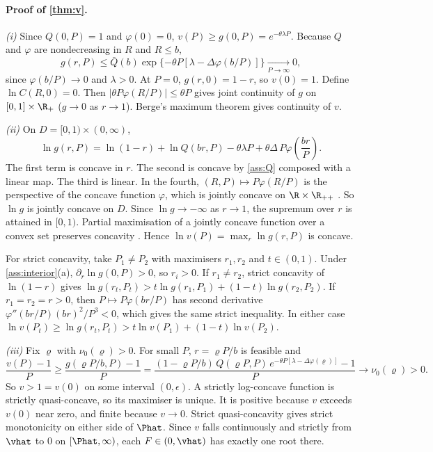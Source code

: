 \paragraph{Proof of \cref{thm:v}.}
\emph{(i)} Since $Q(0,P)=1$ and $\varphi(0)=0$, $v(P)\ge g(0,P)=e^{-\theta\lambda P}$. Because $Q$ and $\varphi$ are nondecreasing in $R$ and $R\le b$,
\[
g(r,P)\le \bar Q(b)\exp\{-\theta P[\lambda-\Delta\varphi(b/P)]\}\xrightarrow[P\to\infty]{}0,
\]
since $\varphi(b/P)\to0$ and $\lambda>0$. At $P=0$, $g(r,0)=1-r$, so $v(0)=1$. Define $\ln C(R,0)=0$. Then $|\theta P\varphi(R/P)|\le\theta P$ gives joint continuity of $g$ on $[0,1]\times\R_+$ ($g\to0$ as $r\to1$). Berge's maximum theorem gives continuity of $v$.

\emph{(ii)} On $D=[0,1)\times(0,\infty)$,
\[
\ln g(r,P)=\ln(1-r)+\ln Q(br,P)-\theta\lambda P+\theta\Delta\,P\varphi\!\left(\frac{br}{P}\right).
\]
The first term is concave in $r$. The second is concave by \cref{ass:Q}
composed with a linear map. The third is linear. In the fourth, $(R,P)\mapsto
P\varphi(R/P)$ is the perspective of the concave function $\varphi$, which is
jointly concave on $\R\times\R_{++}$ \citep[\S3.2.6]{boydvandenberghe2004}. So
$\ln g$ is jointly concave on $D$. Since $\ln g\to-\infty$ as $r\to1$, the
supremum over $r$ is attained in $[0,1)$. Partial maximisation of a jointly
concave function over a convex set preserves concavity
\citep[\S3.2.5]{boydvandenberghe2004}. Hence $\ln v(P)=\max_r\ln g(r,P)$ is concave.

For strict concavity, take $P_1\neq P_2$ with maximisers $r_1,r_2$ and $t\in(0,1)$. Under \cref{ass:interior}(a), $\partial_r\ln g(0,P)>0$, so $r_i>0$. If $r_1\neq r_2$, strict concavity of $\ln(1-r)$ gives
$\ln g(r_t,P_t)>t\ln g(r_1,P_1)+(1-t)\ln g(r_2,P_2)$. If $r_1=r_2=r>0$, then $P\mapsto P\varphi(br/P)$ has second derivative $\varphi''(br/P)(br)^2/P^3<0$, which gives the same strict inequality. In either case $\ln v(P_t)\ge\ln g(r_t,P_t)>t\ln v(P_1)+(1-t)\ln v(P_2)$.

\emph{(iii)} Fix $\varrho$ with $\nu_0(\varrho)>0$. For small $P$, $r=\varrho P/b$ is feasible and
\[
\frac{v(P)-1}{P}\ge\frac{g(\varrho P/b,P)-1}{P}
=\frac{(1-\varrho P/b)\,Q(\varrho P,P)\,e^{-\theta P[\lambda-\Delta\varphi(\varrho)]}-1}{P}\longrightarrow \nu_0(\varrho)>0 .
\]
So $v>1=v(0)$ on some interval $(0,\epsilon)$. A strictly log-concave function is strictly quasi-concave, so its maximiser is unique. It is positive because $v$ exceeds $v(0)$ near zero, and finite because $v\to0$. Strict quasi-concavity gives strict monotonicity on either side of $\Phat$. Since $v$ falls continuously and strictly from $\vhat$ to $0$ on $[\Phat,\infty)$, each $F\in(0,\vhat)$ has exactly one root there.

